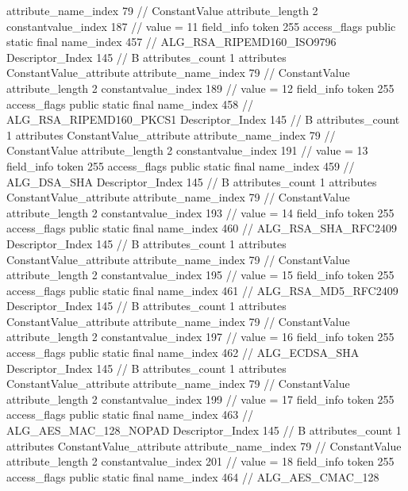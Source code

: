 {{{{{{{					attribute_name_index	79		// ConstantValue
					attribute_length	2
					constantvalue_index	187		// value = 11
				}
				}
			}
			field_info {
				token	255
				access_flags	public static final
				name_index	457		// ALG_RSA_RIPEMD160_ISO9796
				Descriptor_Index	145		// B
				attributes_count	1
				attributes {
				ConstantValue_attribute {
					attribute_name_index	79		// ConstantValue
					attribute_length	2
					constantvalue_index	189		// value = 12
				}
				}
			}
			field_info {
				token	255
				access_flags	public static final
				name_index	458		// ALG_RSA_RIPEMD160_PKCS1
				Descriptor_Index	145		// B
				attributes_count	1
				attributes {
				ConstantValue_attribute {
					attribute_name_index	79		// ConstantValue
					attribute_length	2
					constantvalue_index	191		// value = 13
				}
				}
			}
			field_info {
				token	255
				access_flags	public static final
				name_index	459		// ALG_DSA_SHA
				Descriptor_Index	145		// B
				attributes_count	1
				attributes {
				ConstantValue_attribute {
					attribute_name_index	79		// ConstantValue
					attribute_length	2
					constantvalue_index	193		// value = 14
				}
				}
			}
			field_info {
				token	255
				access_flags	public static final
				name_index	460		// ALG_RSA_SHA_RFC2409
				Descriptor_Index	145		// B
				attributes_count	1
				attributes {
				ConstantValue_attribute {
					attribute_name_index	79		// ConstantValue
					attribute_length	2
					constantvalue_index	195		// value = 15
				}
				}
			}
			field_info {
				token	255
				access_flags	public static final
				name_index	461		// ALG_RSA_MD5_RFC2409
				Descriptor_Index	145		// B
				attributes_count	1
				attributes {
				ConstantValue_attribute {
					attribute_name_index	79		// ConstantValue
					attribute_length	2
					constantvalue_index	197		// value = 16
				}
				}
			}
			field_info {
				token	255
				access_flags	public static final
				name_index	462		// ALG_ECDSA_SHA
				Descriptor_Index	145		// B
				attributes_count	1
				attributes {
				ConstantValue_attribute {
					attribute_name_index	79		// ConstantValue
					attribute_length	2
					constantvalue_index	199		// value = 17
				}
				}
			}
			field_info {
				token	255
				access_flags	public static final
				name_index	463		// ALG_AES_MAC_128_NOPAD
				Descriptor_Index	145		// B
				attributes_count	1
				attributes {
				ConstantValue_attribute {
					attribute_name_index	79		// ConstantValue
					attribute_length	2
					constantvalue_index	201		// value = 18
				}
				}
			}
			field_info {
				token	255
				access_flags	public static final
				name_index	464		// ALG_AES_CMAC_128
}}}}}
